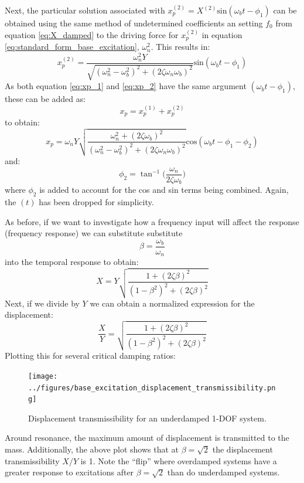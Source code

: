 \documentclass[12pt,letter]{article}
\numberwithin{ex}{section} %
\numberwithin{re}{section} %
\begin{document}
				Next, the particular solution associated with $x_p^{(2)} = X^{(2)} \text{sin}(\omega_b t - \phi_1)$ can be obtained using the same method of undetermined coefficients an setting $f_0$ from equation \ref{eq:X_damped} to the driving force for $x_p^{(2)}$ in equation  \ref{eq:standard_form_base_excitation}, $\omega_n^2$. This results in:
				\begin{equation}
					x_p^{(2)} = \frac{\omega_n^2 Y}{\sqrt{(\omega_n^2 - \omega_b^2)^2 +  (2\zeta \omega_n \omega_b)^2}}  \text{sin}(\omega_b t - \phi_1)
					\label{eq:xp_2}
				\end{equation}
				As both equation \ref{eq:xp_1} and \ref{eq:xp_2}  have the same argument $(\omega_b t - \phi_1)$, these can be added as:
				\begin{equation}
					x_p = 	x_p^{(1)} + x_p^{(2)}
				\end{equation}
				to obtain:
				\begin{equation}
					x_p = 	\omega_n Y   \sqrt{\frac{\omega_n^2 + (2 \zeta \omega_b)^2 }{(\omega_n^2 - \omega_b^2)^2 +  (2\zeta \omega_n \omega_b)^2} }  \text{cos}(\omega_bt - \phi_1 - \phi_2)
				\end{equation}
				and:
				\begin{equation}
					\phi_2 = \tan^{-1} \bigg(\frac{\omega_n}{2\zeta \omega_b}\bigg)
				\end{equation}
				where $\phi_2$ is added to account for the cos and sin terms being combined. Again, the $(t)$ has been dropped for simplicity. 
				
				As before, if we want to investigate how a frequency input will affect the response (frequency response) we can substitute substitute 
				\begin{equation}
				\beta=\frac{\omega_b}{\omega_n}
				\end{equation} 
				into the temporal response to obtain:
				\begin{equation}
				X = Y \sqrt{\frac{1+(2 \zeta \beta)^2}{(1-\beta^2)^2 + (2 \zeta \beta )^2}} 
				\end{equation} 
				Next, if we divide by $Y$ we can obtain a normalized expression for the displacement:
				\begin{equation}
				\frac{X}{Y} = \sqrt{\frac{1+(2 \zeta \beta)^2}{(1-\beta^2)^2 + (2 \zeta \beta )^2}} 
				\end{equation} 
				Plotting this for several critical damping ratios:
				\begin{figure}[H]
					\centering
					\texttt{[image: ../figures/base\_excitation\_displacement\_transmissibility.png]}
					\caption{Displacement transmissibility for an underdamped 1-DOF system.}
				\end{figure}
				Around resonance, the maximum amount of displacement is transmitted to the mass. Additionally,  the above plot shows that at $\beta=\sqrt{2}$ the displacement transmissibility $X/Y$ is 1. Note the ``flip'' where overdamped systems have a greater response to excitations after $\beta=\sqrt{2}$ than do underdamped systems.
\end{document}
